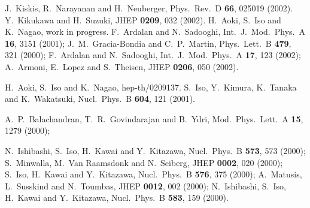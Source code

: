 \documentclass[a4paper,prl,showpacs,twocolumn]{revtex4}
\begin{document}
\begin{thebibliography}{all}
%
J.~Kiskis, R.~Narayanan and H.~Neuberger,
Phys.\ Rev.\ D {\bf 66}, 025019 (2002).
Y.~Kikukawa and H.~Suzuki,
JHEP {\bf 0209}, 032 (2002).
H.~Aoki, S.~Iso and K.~Nagao, work in progress.
F.~Ardalan and N.~Sadooghi,
Int.\ J.\ Mod.\ Phys.\ A {\bf 16}, 3151 (2001);
J.~M.~Gracia-Bondia and C.~P.~Martin,
Phys.\ Lett.\ B {\bf 479}, 321 (2000);
F.~Ardalan and N.~Sadooghi,
Int.\ J.\ Mod.\ Phys.\ A {\bf 17}, 123 (2002);
%
A.~Armoni, E.~Lopez and S.~Theisen,
JHEP {\bf 0206}, 050 (2002).

H.~Aoki, S.~Iso and K.~Nagao, 
hep-th/0209137.
S.~Iso, Y.~Kimura, K.~Tanaka and K.~Wakatsuki,
Nucl.\ Phys.\ B {\bf 604}, 121 (2001).

A.~P.~Balachandran, T.~R.~Govindarajan and B.~Ydri,
Mod.\ Phys.\ Lett.\ A {\bf 15}, 1279 (2000);


N.~Ishibashi, S.~Iso, H.~Kawai and Y.~Kitazawa,
Nucl.\ Phys.\ B {\bf 573}, 573 (2000);
S.~Minwalla, M.~Van Raamsdonk and N.~Seiberg,
JHEP {\bf 0002}, 020 (2000);
S.~Iso, H.~Kawai and Y.~Kitazawa,
Nucl.\ Phys.\ B {\bf 576}, 375 (2000);
A.~Matusis, L.~Susskind and N.~Toumbas,
JHEP {\bf 0012}, 002 (2000);
N.~Ishibashi, S.~Iso, H.~Kawai and Y.~Kitazawa,
Nucl.\ Phys.\ B {\bf 583}, 159 (2000).

\end{thebibliography}
\end{document}
